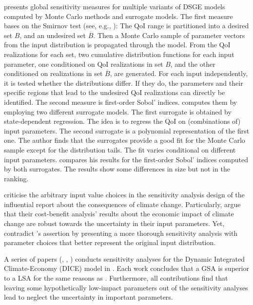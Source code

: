 \documentclass[a4paper,12pt]{article}
\begin{document}
\cite{Ratto.2008} presents global sensitivity measures for multiple variants of DSGE models computed by Monte Carlo methods and surrogate models. The first measure bases on the Smirnov test (see, e.g., \cite{Hornberger.1981}): The QoI range is partitioned into a desired set $B$, and an undesired set $\overline{B}$. Then a Monte Carlo sample of parameter vectors from the input distribution is propagated through the model. From the QoI realizations for each set, two cumulative distribution functions for each input parameter, one conditioned on QoI realizations in set $B$, and the other conditioned on realizations in set $\overline{B}$, are generated. For each input independently, it is tested whether the distributions differ. If they do, the parameters and their specific regions that lead to the undesired QoI realizations can directly be identified. The second measure is first-order Sobol' indices. \citeauthor{Ratto.2008} computes them by employing two different surrogate models. The first surrogate is obtained by state-dependent regression. The idea is to regress the QoI on (combinations of) input parameters. The second surrogate is a polynomial representation of the first one. The author finds that the surrogates provide a good fit for the Monte Carlo sample except for the distribution tails. The fit varies conditional on different input parameters. \citeauthor{Ratto.2008} compares his results for the first-order Sobol' indices computed by both surrogates. The results show some differences in size but not in the ranking.

\cite{Saltelli.2010} criticise the arbitrary input value choices in the sensitivity analysis design of the influential \cite{Stern.2007} report about the consequences of climate change. Particularly, \citeauthor{Stern.2007} argue that their cost-benefit analysis' results about the economic impact of climate change are robust towards the uncertainty in their input parameters. Yet, \cite{Saltelli.2010} contradict \citeauthor{Stern.2007}'s assertion by presenting a more thorough sensitivity analysis with parameter choices that better represent the original input distribution.

A series of papers (\cite{Anderson.2014}, \cite{Butler.2014}, \cite{Miftakhova.2018}) conducts sensitivity analyses for the Dynamic Integrated Climate-Economy (DICE) model in \cite{Nordhaus.2008}.  Each work concludes that a GSA is superior to a LSA for the same reasons as \cite{Harenberg.2019}. Furthermore, all contributions find that leaving some hypothetically low-impact parameters out of the sensitivity analyses lead \citeauthor{Nordhaus.2008} to neglect the uncertainty in important parameters.
\end{document}
